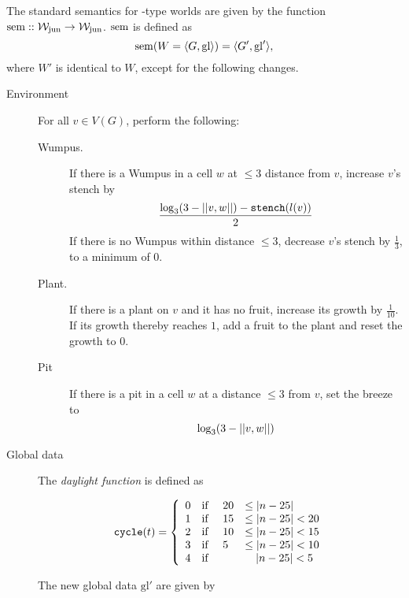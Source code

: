 \begin{definition}
\label{def:ssem}
The standard semantics for \wjun-type worlds are given by the function $\mathrm{sem} :: \mathtt{\mathcal{W}_{\mathrm{jun}} \rightarrow \mathcal{W}_{\mathrm{jun}}}$. $\mathrm{sem}$ is defined as 
$$\mathrm{sem}(W = \langle G, \mathrm{gl} \rangle) = \langle G', \mathrm{gl}' \rangle, $$
where $W'$ is identical to $W$, except for the following changes.\\

\begin{description}
	\item[Environment] For all $v \in V(G)$, perform the following:
	
	\begin{description}
		\item[Wumpus.] If there is a Wumpus in a cell $w$ at $\leq 3$ distance from $v$, increase $v$'s stench by
		$$
			\frac{
				\log_{3}(3 - ||{v},{w}||) - \mathtt{stench}(l(v))
			}{2}
		$$
		If there is no Wumpus within distance $\leq 3$, decrease $v$'s stench by $\frac{1}{3}$, to a minimum of 0.
		
		\item[Plant.] If there is a plant on $v$ and it has no fruit, increase its growth by $\frac{1}{10}$. If its growth thereby reaches $1$, add a fruit to the plant and reset the growth to 0.
		
		\item[Pit] If there is a pit in a cell $w$ at a distance $\leq 3$ from $v$, set the breeze to
 		$$
			\log_{3}(3 - ||{v},{w}||)
		$$
	\end{description}
	
	\item[Global data] The {\em daylight function} is defined as
	
	$$
			\mathtt{cycle}(t) = 
			\left\{
				\begin{array}{l l l l}
					0 & \textnormal{if } & 20 & \leq |n - 25|\\
					1 & \textnormal{if } & 15 & \leq |n - 25| < 20\\
					2 & \textnormal{if } & 10 & \leq |n - 25| < 15\\
					3 & \textnormal{if } & 5 & \leq |n - 25| < 10\\
					4 & \textnormal{if } & & \ \ \ |n - 25| < 5
				\end{array}
			\right.
	$$
	
	The new global data $\mathrm{gl}'$ are given by
	

\end{description}
\end{definition}
